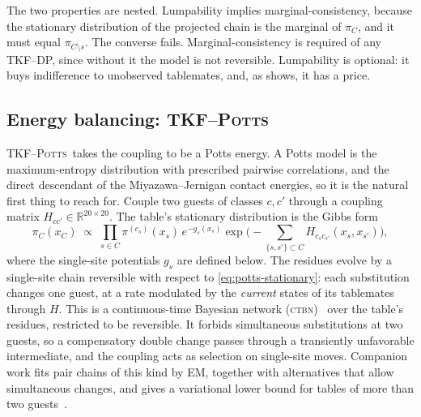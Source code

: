 \documentclass[11pt]{article}
\newcommand{\Potts}{\textsc{TKF--Potts}}
\newcommand{\CTBN}{\textsc{ctbn}}
\newcommand{\R}{\mathbb{R}}
\newcommand{\eqm}{\pi}
\begin{document}
The two properties are nested. Lumpability implies marginal-consistency,
because the stationary distribution of the projected chain is the marginal of
$\eqm_C$, and it must equal $\eqm_{C\setminus s}$. The converse fails.
Marginal-consistency is required of any TKF--DP, since without it the model is
not reversible. Lumpability is optional: it buys indifference to unobserved
tablemates, and, as  shows, it has a price.

\subsection{Energy balancing: \Potts}
\label{sec:potts}

\Potts\ takes the coupling to be a Potts energy. A Potts model is the
maximum-entropy distribution with prescribed pairwise correlations, and the
direct descendant of the Miyazawa--Jernigan contact energies, so it is the
natural first thing to reach for. Couple two guests of classes $c,c'$ through
a coupling matrix $H_{cc'}\in\R^{20\times20}$. The table's stationary
distribution is the Gibbs form
\begin{equation}
\label{eq:potts-stationary}
\eqm_C(x_C)\;\propto\;\prod_{s\in C}\eqm^{(c_s)}(x_s)\,e^{-g_s(x_s)}
\exp\Big(-\!\!\sum_{\{s,s'\}\subset C}\!\!H_{c_sc_{s'}}(x_s,x_{s'})\Big),
\end{equation}
where the single-site potentials $g_s$ are defined below. The residues evolve
by a single-site chain reversible with respect to \cref{eq:potts-stationary}:
each substitution changes one guest, at a rate modulated by the \emph{current}
states of its tablemates through $H$. This is a continuous-time Bayesian
network (\CTBN)~\citep{nodelman2002} over the table's residues, restricted to
be reversible. It forbids simultaneous substitutions at two guests, so a
compensatory double change passes through a transiently unfavorable
intermediate, and the coupling acts as selection on single-site moves.
Companion work fits pair chains of this kind by EM, together with
alternatives that allow simultaneous changes, and gives a variational lower
bound for tables of more than two guests~\citep{LargeHolmes2026Coupled}.
\end{document}
